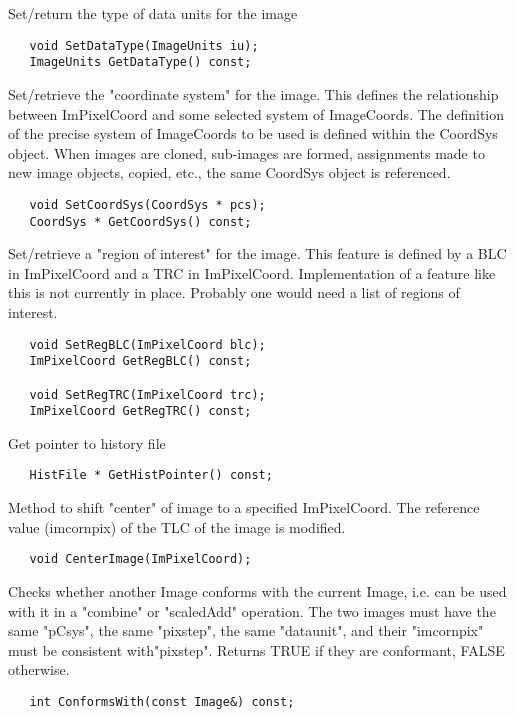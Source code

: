       Set/return the type of data units for the image
\begin{verbatim}
   void SetDataType(ImageUnits iu);
   ImageUnits GetDataType() const;

\end{verbatim}

      Set/retrieve the "coordinate system" for the image. This defines
      the relationship between ImPixelCoord and some selected system
      of ImageCoords. The definition of the precise system of ImageCoords
      to be used is defined within the CoordSys object. When images are
      cloned, sub-images are formed, assignments made to new image objects,
      copied, etc., the same CoordSys object is referenced.
\begin{verbatim}
   void SetCoordSys(CoordSys * pcs);
   CoordSys * GetCoordSys() const;

\end{verbatim}

      Set/retrieve a "region of interest" for the image. This feature
      is defined by a BLC in ImPixelCoord and a TRC in ImPixelCoord.
      Implementation of a feature like this is not currently in place.
      Probably one would need a list of regions of interest.
\begin{verbatim}
   void SetRegBLC(ImPixelCoord blc);
   ImPixelCoord GetRegBLC() const;

   void SetRegTRC(ImPixelCoord trc);
   ImPixelCoord GetRegTRC() const;

\end{verbatim}

      Get pointer to history file
\begin{verbatim}
   HistFile * GetHistPointer() const;

\end{verbatim}

      Method to shift "center" of image to a specified ImPixelCoord. The
      reference value (imcornpix) of the TLC of the image is modified.
\begin{verbatim}
   void CenterImage(ImPixelCoord);

\end{verbatim}
      Checks whether another Image conforms with the current Image, i.e. can 
      be used with it in a "combine" or "scaledAdd" operation. The two images  
      must have the same "pCsys", the same "pixstep", the same "dataunit",
      and their "imcornpix" must be consistent with"pixstep". Returns TRUE
      if they are conformant, FALSE otherwise.
\begin{verbatim}
   int ConformsWith(const Image&) const;

\end{verbatim}

